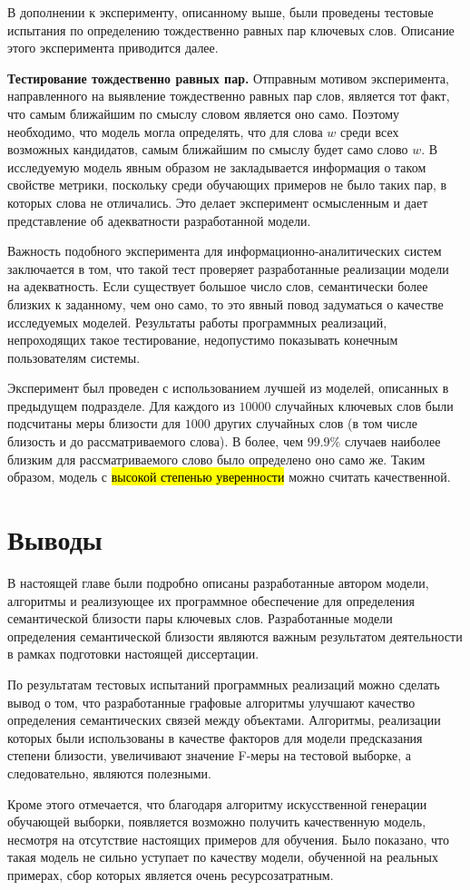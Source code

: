 В дополнении к эксперименту, описанному выше, были проведены тестовые испытания по определению тождественно равных пар ключевых слов. Описание этого эксперимента приводится далее.

\textbf{Тестирование тождественно равных пар.} \label{sec:test_equal}
Отправным мотивом эксперимента, направленного на выявление тождественно равных пар слов, является тот факт, что самым ближайшим по смыслу словом является оно само. Поэтому необходимо, что модель могла определять, что для слова $w$ среди всех возможных кандидатов, самым ближайшим по смыслу будет само слово $w$. В исследуемую модель явным образом не закладывается информация о таком свойстве метрики, поскольку среди обучающих примеров не было таких пар, в которых слова не отличались. Это делает эксперимент осмысленным и дает представление об адекватности разработанной модели.

Важность подобного эксперимента для информационно-аналитических систем заключается в том, что такой тест проверяет разработанные реализации модели на адекватность. Если существует большое число слов, семантически более близких к заданному, чем оно само, то это явный повод задуматься о качестве исследуемых моделей. Результаты работы программных реализаций, непроходящих такое тестирование, недопустимо показывать конечным пользователям системы.

Эксперимент был проведен с использованием лучшей из моделей, описанных в предыдущем подразделе. Для каждого из $10000$ случайных ключевых слов были подсчитаны меры близости для $1000$ других случайных слов (в том числе близость и до рассматриваемого слова). В более, чем $99.9\%$ случаев наиболее близким для рассматриваемого слово было определено оно само же. Таким образом, модель с \hl{высокой степенью уверенности} можно считать качественной.

\section{Выводы}

В настоящей главе были подробно описаны разработанные автором модели, алгоритмы и реализующее их программное обеспечение для определения семантической близости пары ключевых слов. Разработанные модели определения семантической близости являются важным результатом деятельности в рамках подготовки настоящей диссертации.

По результатам тестовых испытаний программных реализаций можно сделать вывод о том, что разработанные графовые алгоритмы улучшают качество определения семантических связей между объектами. Алгоритмы, реализации которых были использованы в качестве факторов для модели предсказания степени близости, увеличивают значение F-меры на тестовой выборке, а следовательно, являются полезными. 

Кроме этого отмечается, что благодаря алгоритму искусственной генерации обучающей выборки, появляется возможно получить качественную модель, несмотря на отсутствие настоящих примеров для обучения. Было показано, что такая модель не сильно уступает по качеству модели, обученной на реальных примерах, сбор которых является очень ресурсозатратным.

